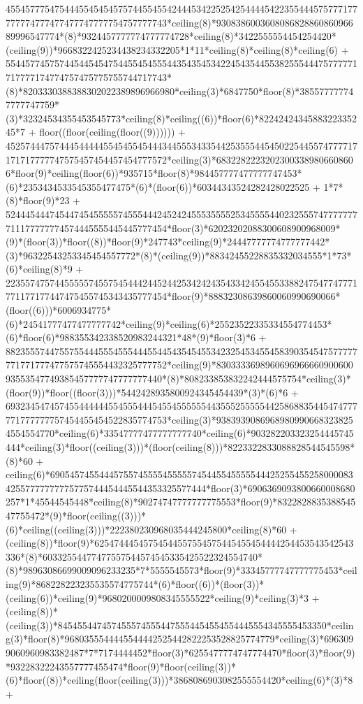 455457775475444554545457574455455424445342252542544445422355444575777177777774777477477747777754757777743*ceiling(8)*930838600360808682886086096689996547774*(8)*9324457777774777774728*ceiling(8)*3422555554454254420*(ceiling(9))*9668322425234438234332205*1*11*ceiling(8)*ceiling(8)*ceiling(6) + 554457745757445445454754455454555443543545342245435445538255544475777771717777174774757475775755744717743*(8)*8203330388388302022389896966980*ceiling(3)*6847750*floor(8)*385577777747777747759*(3)*32324534355453545773*ceiling(8)*ceiling((6))*floor(6)*8224242434588322335245*7 + floor((floor(ceiling(floor((9)))))) + 452574447574445444445545455454443445553433544253555445450225445574777717171717777747575457454457454777572*ceiling(3)*68322822232023003389806608606*floor(9)*ceiling(floor(6))*935715*floor(8)*984457777477777747453*(6)*2353434533545355477475*(6)*(floor(6))*60344343524282428022525 + 1*7*(8)*floor(9)*23 + 524445444745447454555557455544424524245553555525345555440232555747777777711177777774574445555445445777454*floor(3)*62023202088300608900968009*(9)*(floor(3))*floor((8))*floor(9)*247743*ceiling(9)*24447777774777777442*(3)*96322543253345454557772*(8)*(ceiling(9))*88342455228835332034555*1*73*(6)*ceiling(8)*9 + 223557475744555557455754544424452442534242435433424554553388247547747771771177177447475455745343435777454*floor(9)*88832308639860060990690066*(floor((6)))*6006934775*(6)*24541777477477777742*ceiling(9)*ceiling(6)*25523522335334554774453*(6)*floor(6)*988355342338520983244321*48*(9)*floor(3)*6 + 882355574475575544455545554445544543545455342325453455458390354547577777771771777477575745554432325777752*ceiling(9)*830333369896069696666090060093553547749385457777747777777440*(8)*808233853832242444575754*ceiling(3)*(floor(9))*floor((floor(3)))*5442428935800924345454439*(3)*(6)*6 + 693234547457455444444554555444545545555554435552555554425868835445474777771777777757454455454522835774753*ceiling(3)*93839390869689809906683238254554554770*ceiling(6)*33547777477777777740*ceiling(6)*903282203323254445745444*ceiling(3)*floor((ceiling(3)))*(floor(ceiling(8)))*8223322833088828544545598*(8)*60 + ceiling(6)*6905457455444575574555545555574544554555554442525545525800008342557777777775775744454445544353325577444*floor(3)*6906369093800660008680257*1*45544545448*ceiling(8)*90274747777777775553*floor(9)*832282883538854547755472*(9)*floor(ceiling((3)))*(6)*ceiling((ceiling(3)))*222380230968035444245800*ceiling(8)*60 + (ceiling(8))*floor(9)*62547444545754544557554575445455454444254453543542543336*(8)*60332554477477557544574545335425522324554740*(8)*98963086699009096233235*7*5555545573*floor(9)*33345777747777775453*ceiling(9)*868228223235535574775744*(6)*floor((6))*(floor(3))*(ceiling(6))*ceiling(9)*9680200009808345555522*ceiling(9)*ceiling(3)*3 + (ceiling(8))*(ceiling(3))*8454554474574555745554475554454554554445554345555453350*ceiling(3)*floor(8)*9680355544445544442525442822253528825774779*ceiling(3)*6963099060960983382487*7*7174444452*floor(3)*6255477774747774470*floor(3)*floor(9)*93228322243557777455474*floor(9)*floor(ceiling(3))*(6)*floor((8))*ceiling(floor(ceiling(3)))*3868086903082555554420*ceiling(6)*(3)*8 + 
